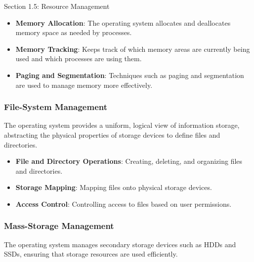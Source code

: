 \begin{notes}{Section 1.5: Resource Management}
    \begin{highlight}
    
    \begin{itemize}
        \item \textbf{Memory Allocation}: The operating system allocates and deallocates memory space as needed by processes.
        \item \textbf{Memory Tracking}: Keeps track of which memory areas are currently being used and which processes are using them.
        \item \textbf{Paging and Segmentation}: Techniques such as paging and segmentation are used to manage memory more effectively.
    \end{itemize}
    
    \end{highlight}
    
    \subsubsection*{File-System Management}
    
    The operating system provides a uniform, logical view of information storage, abstracting the physical properties of storage devices to define files and directories.
    
    \begin{highlight}
    
    \begin{itemize}
        \item \textbf{File and Directory Operations}: Creating, deleting, and organizing files and directories.
        \item \textbf{Storage Mapping}: Mapping files onto physical storage devices.
        \item \textbf{Access Control}: Controlling access to files based on user permissions.
    \end{itemize}
    
    \end{highlight}
    
    \subsubsection*{Mass-Storage Management}
    
    The operating system manages secondary storage devices such as HDDs and SSDs, ensuring that storage resources are used efficiently.
    

\end{notes}
